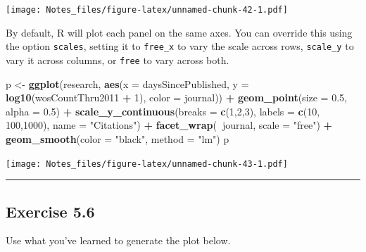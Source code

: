 \documentclass[
]{book}
\newenvironment{Shaded}{\begin{snugshade}}{\end{snugshade}}
\newcommand{\DataTypeTok}[1]{\textcolor[rgb]{0.13,0.29,0.53}{#1}}
\newcommand{\DecValTok}[1]{\textcolor[rgb]{0.00,0.00,0.81}{#1}}
\newcommand{\FloatTok}[1]{\textcolor[rgb]{0.00,0.00,0.81}{#1}}
\newcommand{\KeywordTok}[1]{\textcolor[rgb]{0.13,0.29,0.53}{\textbf{#1}}}
\newcommand{\NormalTok}[1]{#1}
\newcommand{\OperatorTok}[1]{\textcolor[rgb]{0.81,0.36,0.00}{\textbf{#1}}}
\newcommand{\StringTok}[1]{\textcolor[rgb]{0.31,0.60,0.02}{#1}}
\begin{document}
\texttt{[image: Notes\_files/figure-latex/unnamed-chunk-42-1.pdf]}

By default, R will plot each panel on the same axes. You can override this using the option \texttt{scales}, setting it to \texttt{free\_x} to vary the scale across rows, \texttt{scale\_y} to vary it across columns, or \texttt{free} to vary across both.

\begin{Shaded}
\begin{Highlighting}[]
\NormalTok{p <-}\StringTok{ }\KeywordTok{ggplot}\NormalTok{(research, }\KeywordTok{aes}\NormalTok{(}\DataTypeTok{x =}\NormalTok{ daysSincePublished, }
                          \DataTypeTok{y =} \KeywordTok{log10}\NormalTok{(wosCountThru2011 }\OperatorTok{+}\StringTok{ }\DecValTok{1}\NormalTok{),}
                          \DataTypeTok{color =}\NormalTok{ journal)) }\OperatorTok{+}
\StringTok{  }\KeywordTok{geom_point}\NormalTok{(}\DataTypeTok{size =} \FloatTok{0.5}\NormalTok{, }\DataTypeTok{alpha =} \FloatTok{0.5}\NormalTok{) }\OperatorTok{+}
\StringTok{  }\KeywordTok{scale_y_continuous}\NormalTok{(}\DataTypeTok{breaks =} \KeywordTok{c}\NormalTok{(}\DecValTok{1}\NormalTok{,}\DecValTok{2}\NormalTok{,}\DecValTok{3}\NormalTok{), }\DataTypeTok{labels =} \KeywordTok{c}\NormalTok{(}\DecValTok{10}\NormalTok{, }\DecValTok{100}\NormalTok{,}\DecValTok{1000}\NormalTok{), }\DataTypeTok{name =} \StringTok{"Citations"}\NormalTok{) }\OperatorTok{+}
\StringTok{  }\KeywordTok{facet_wrap}\NormalTok{(}\OperatorTok{~}\NormalTok{journal, }\DataTypeTok{scale =} \StringTok{"free"}\NormalTok{) }\OperatorTok{+}
\StringTok{  }\KeywordTok{geom_smooth}\NormalTok{(}\DataTypeTok{color =} \StringTok{"black"}\NormalTok{, }\DataTypeTok{method =} \StringTok{"lm"}\NormalTok{)}
\NormalTok{p}
\end{Highlighting}
\end{Shaded}

\texttt{[image: Notes\_files/figure-latex/unnamed-chunk-43-1.pdf]}

\begin{center}\rule{0.5\linewidth}{0.5pt}\end{center}

\hypertarget{exercise-5.6}{%
\subsection*{Exercise 5.6}\label{exercise-5.6}}

Use what you've learned to generate the plot below.
\end{document}
